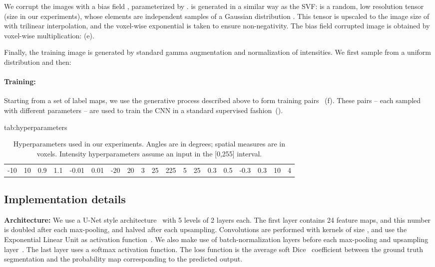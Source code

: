 \documentclass{midl}
\begin{document}
We corrupt the images with a bias field , parameterized by .   is generated in a similar way as the SVF:  is a random, low resolution tensor (size  in our experiments), whose elements are independent samples of a Gaussian distribution . This tensor is upscaled to the image size of  with trilinear interpolation, and the voxel-wise exponential is taken to ensure non-negativity. The bias field corrupted image  is obtained by voxel-wise multiplication:  (e). 

Finally, the training image  is generated by standard gamma augmentation and normalization of intensities. We first sample   from a uniform distribution  and then:


\paragraph{Training:} Starting from a set of label maps, we use the generative process described above to form training pairs~ (f). These pairs -- each sampled with different parameters -- are used to train the CNN in a standard supervised fashion~(). 


\begin{table}[tbp]
\setlength\tabcolsep{3pt} 
\floatconts
  {tab:hyperparameters}
  {\caption{Hyperparameters used in our experiments. Angles are in degrees;  spatial measures are in voxels. Intensity hyperparameters assume an input in the [0,255] interval.}  
  }
  {\small \begin{tabular}{|c|c|c|c|c|c|c|c|c|c|c|c|c|c|c|c|c|c|c|}
  \hline
  &  &  &  &  &  &  &  &  &  &  &  &  & &  &  &  &  &  \\
  \hline
  -10 & 10 & 0.9 & 1.1 & -0.01 & 0.01 & -20 & 20 & 3 & 25 & 225 & 5 & 25 & 0.3 & 0.5 & -0.3 & 0.3 & 10 & 4\\
  \hline
  \end{tabular}}
\end{table}


\subsection{Implementation details}
\label{implementation details}

\textbf{Architecture:} We use a U-Net style architecture~\cite{ronneberger_u-net_2015,cicek_3d_2016} with 5 levels of 2 layers each. The first layer contains 24 feature maps, and this number is doubled after each max-pooling, and halved after each upsampling. Convolutions are performed with kernels of size , and use the Exponential Linear Unit as activation function~\cite{clevert_fast_2016}. We also make use of batch-normalization layers before each max-pooling and upsampling layer~\cite{ioffe_batch_2015}. The last layer uses a softmax activation function. The loss function is the average soft Dice~\cite{milletari_v-net_2016} coefficient between the ground truth segmentation and the probability map corresponding to the predicted output.
\end{document}
